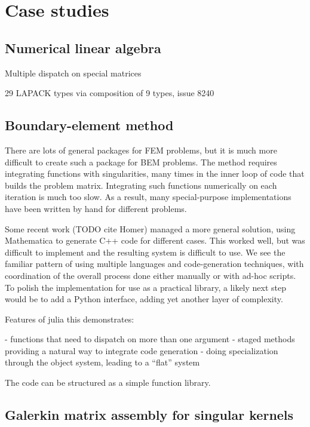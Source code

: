 \chapter{Case studies}


\section{Numerical linear algebra}

Multiple dispatch on special matrices

29 LAPACK types via composition of 9 types, issue 8240


\section{Boundary-element method}

There are lots of general packages for FEM problems, but it is much more
difficult to create such a package for BEM problems. The method requires
integrating functions with singularities, many times in the inner loop
of code that builds the problem matrix. Integrating such functions
numerically on each iteration is much too slow. As a result, many
special-purpose implementations have been written by hand for different
problems.

Some recent work (TODO cite Homer) managed a more general solution,
using Mathematica to generate C++ code for different cases. This worked
well, but was difficult to implement and the resulting system is difficult
to use. We see the familiar pattern of using multiple languages and
code-generation techniques, with coordination of the overall process done
either manually or with ad-hoc scripts. To polish the implementation for
use as a practical library, a likely next step would be to add a Python
interface, adding yet another layer of complexity.


Features of julia this demonstrates:

- functions that need to dispatch on more than one argument
- staged methods providing a natural way to integrate code generation
- doing specialization through the object system, leading to a ``flat'' system

The code can be structured as a simple function library.



\section{Galerkin matrix assembly for singular kernels}

